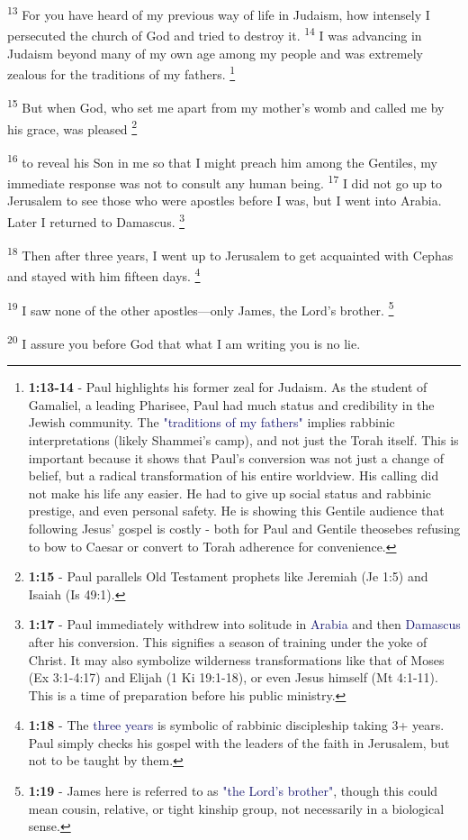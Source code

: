 \documentclass[12pt,twoside]{article}
\newcommand{\vs}[1]{\textsuperscript{#1}}
\newcommand{\vnote}[2]{%
  \begingroup
  \renewcommand\thefootnote{}%
  \footnote{\scriptsize \textbf{}#2}%
  \addtocounter{footnote}{-1}%
  \endgroup
}
\begin{document}
\vs{13} For you have heard of my previous way of life in Judaism, how intensely I persecuted the church of God and tried to destroy it.
\vs{14} I was advancing in Judaism beyond many of my own age among my people and was extremely zealous for the traditions of my fathers.\vnote{14}{\textbf{1:13-14} - Paul highlights his former zeal for Judaism. As the student of Gamaliel, a leading Pharisee, Paul had much status and credibility in the Jewish community. The \textcolor{MidnightBlue}{"traditions of my fathers"} implies rabbinic interpretations (likely Shammei's camp), and not just the Torah itself. This is important because it shows that Paul's conversion was not just a change of belief, but a radical transformation of his entire worldview. His calling did not make his life any easier. He had to give up social status and rabbinic prestige, and even personal safety. He is showing this Gentile audience that following Jesus' gospel is costly - both for Paul and Gentile theosebes refusing to bow to Caesar or convert to Torah adherence for convenience.}
\vs{15} But when God, who set me apart from my mother's womb and called me by his grace, was pleased\vnote{15}{\textbf{1:15} - Paul parallels Old Testament prophets like Jeremiah (Je 1:5) and Isaiah (Is 49:1).}
\vs{16} to reveal his Son in me so that I might preach him among the Gentiles, my immediate response was not to consult any human being.
\vs{17} I did not go up to Jerusalem to see those who were apostles before I was, but I went into Arabia. Later I returned to Damascus.\vnote{17}{\textbf{1:17} - Paul immediately withdrew into solitude in \textcolor{MidnightBlue}{Arabia} and then \textcolor{MidnightBlue}{Damascus} after his conversion. This signifies a season of training under the yoke of Christ. It may also symbolize wilderness transformations like that of Moses (Ex 3:1-4:17) and Elijah (1 Ki 19:1-18), or even Jesus himself (Mt 4:1-11). This is a time of preparation before his public ministry.}

\vs{18} Then after three years, I went up to Jerusalem to get acquainted with Cephas and stayed with him fifteen days.\vnote{18}{\textbf{1:18} - The \textcolor{MidnightBlue}{three years} is symbolic of rabbinic discipleship taking 3+ years. Paul simply checks his gospel with the leaders of the faith in Jerusalem, but not to be taught by them.}
\vs{19} I saw none of the other apostles---only James, the Lord's brother.\vnote{19}{\textbf{1:19} - James here is referred to as \textcolor{MidnightBlue}{"the Lord's brother"}, though this could mean cousin, relative, or tight kinship group, not necessarily in a biological sense.}
\vs{20} I assure you before God that what I am writing you is no lie.
\end{document}
